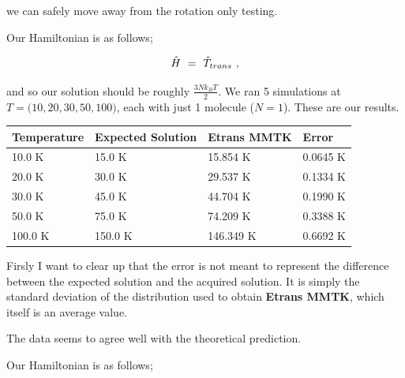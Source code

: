\documentclass{article}
\newcounter{subsubsubsection}[subsubsection]
\begin{document}
we can safely move away from the rotation only testing. 


Our Hamiltonian is as follows;

\begin{equation} \label{eq:3}
\hat{H} \hspace{0.125cm} = \hspace{0.125cm} \hat{T}_{trans} \hspace{0.125cm} ,
\end{equation}

and so our solution should be roughly \begin{math} \frac{3 N k_{B} T}{2} \end{math}. We ran 5 simulations at \begin{math} T = \Big( 10 , 20 , 30 , 50 , 100 \Big) \end{math}, each with just 1 molecule (\begin{math} N = 1 \end{math}). These are our results.

\begin{center}
\begin{tabular*}{\textwidth}{ | p{} | p{}| p{}| p{}|}
\hline
\textbf{Temperature} & \textbf{Expected Solution} & \textbf{Etrans MMTK} & \textbf{Error} \\ 
\hline 
10.0 K & 15.0 K & 15.854 K & 0.0645 K \\ 
\hline
20.0 K & 30.0 K & 29.537 K & 0.1334 K \\
\hline 
30.0 K & 45.0 K & 44.704 K & 0.1990 K \\ 
\hline 
50.0 K & 75.0 K & 74.209 K & 0.3388 K \\
\hline 
100.0 K & 150.0 K & 146.349 K & 0.6692 K \\
\hline 
\end{tabular*}
\end{center} 

Firsly I want to clear up that the error is not meant to represent the difference between the expected solution and the acquired solution. It is simply the standard deviation of the distribution used to obtain \textbf{Etrans MMTK}, which itself is an average value. 

The data seems to agree well with the theoretical prediction. 


Our Hamiltonian is as follows;
\end{document}
